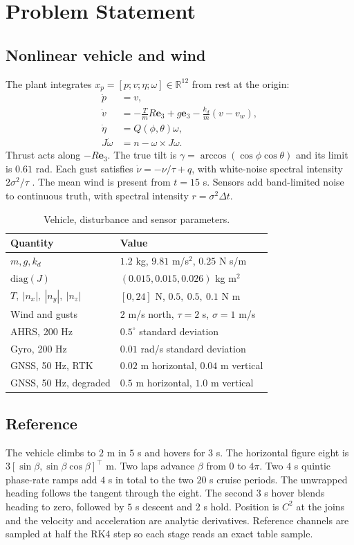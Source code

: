 \documentclass[conference]{IEEEtran}
\newcommand{\e}{\mathbf e_3}
\newcommand{\rr}{\mathbb R}
\begin{document}
\section{Problem Statement}
\subsection{Nonlinear vehicle and wind}
The plant integrates \(x_p=[p;v;\eta;\omega]\in\rr^{12}\)
from rest at the origin:
\begin{align}
\dot p&=v,\\
\dot v&=-\frac{T}{m}R\e+g\e-\frac{k_d}{m}(v-v_w),\\
\dot\eta&=Q(\phi,\theta)\omega,\\
J\dot\omega&=n-\omega\times J\omega .
\end{align}
Thrust acts along \(-R\e\). The true tilt is
\(\gamma=\arccos(\cos\phi\cos\theta)\) and its limit is
\(0.61\) rad. Each gust satisfies
\(\dot\nu=-\nu/\tau+q\), with white-noise spectral intensity
\(2\sigma^2/\tau\) \cite{jazwinski}.
The mean wind is present from \(t=15\) s. Sensors add
band-limited noise to continuous truth, with spectral
intensity \(r=\sigma^2\Delta t\).

\begin{table}[!ht]
\centering
\caption{Vehicle, disturbance and sensor parameters.}
\footnotesize
\begin{tabular}{@{}ll@{}}\toprule
Quantity & Value\\\midrule
\(m,g,k_d\) & \(1.2\) kg, \(9.81\) m/s\(^2\), \(0.25\) N s/m\\
\(\mathrm{diag}(J)\) & \((0.015,0.015,0.026)\) kg m\(^2\)\\
\(T,\ |n_x|,\ |n_y|,\ |n_z|\) & \([0,24]\) N, \(0.5,\ 0.5,\ 0.1\) N m\\
Wind and gusts & \(2\) m/s north, \(\tau=2\) s, \(\sigma=1\) m/s\\
AHRS, 200 Hz & \(0.5^\circ\) standard deviation\\
Gyro, 200 Hz & \(0.01\) rad/s standard deviation\\
GNSS, 50 Hz, RTK & \(0.02\) m horizontal, \(0.04\) m vertical\\
GNSS, 50 Hz, degraded & \(0.5\) m horizontal, \(1.0\) m vertical\\
\bottomrule\end{tabular}
\end{table}

\subsection{Reference}
The vehicle climbs to \(2\) m in \(5\) s and hovers for \(3\) s.
The horizontal figure eight is
\(3[\sin\beta,\sin\beta\cos\beta]^\top\) m.
Two laps advance \(\beta\) from \(0\) to \(4\pi\).
Two \(4\) s quintic phase-rate ramps add \(4\) s in total to
the two \(20\) s cruise periods. The unwrapped heading follows
the tangent through the eight. The second \(3\) s hover blends
heading to zero, followed by \(5\) s descent and \(2\) s hold.
Position is \(C^2\) at the joins and the velocity and acceleration
are analytic derivatives. Reference channels are sampled at
half the RK4 step so each stage reads an exact table sample.
\end{document}
